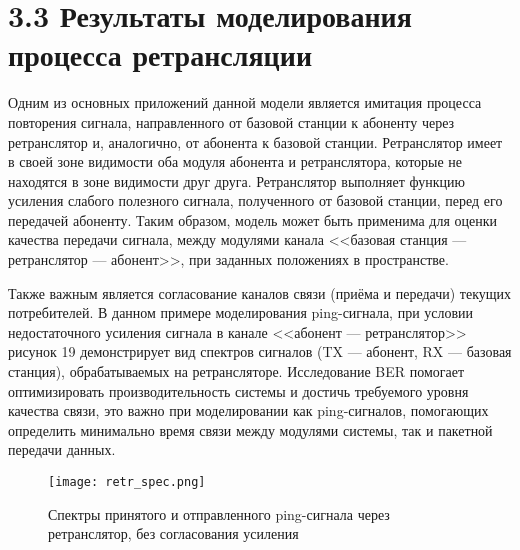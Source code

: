 \section*{\large{3.3 Результаты моделирования процесса ретрансляции}}
\begin{onehalfspace}

Одним из основных приложений данной модели является имитация процесса повторения сигнала, направленного от базовой станции к абоненту через ретранслятор и, аналогично, от абонента к базовой станции. Ретранслятор имеет в своей зоне видимости оба модуля абонента и ретранслятора, которые не находятся в зоне видимости друг друга. Ретранслятор выполняет функцию усиления слабого полезного сигнала, полученного от базовой станции, перед его передачей абоненту. Таким образом, модель может быть применима для оценки качества передачи сигнала, между модулями канала <<базовая станция — ретранслятор — абонент>>, при заданных положениях в пространстве. 


Также важным является согласование каналов связи (приёма и передачи) текущих потребителей. В данном примере моделирования ping-сигнала, при условии недостаточного усиления сигнала в канале <<абонент — ретранслятор>> рисунок 19 демонстрирует вид спектров сигналов (TX — абонент, RX — базовая станция), обрабатываемых на ретрансляторе. Исследование BER помогает оптимизировать производительность системы и достичь требуемого уровня качества связи, это важно при моделировании как ping-сигналов, помогающих определить минимально время связи между модулями системы, так и пакетной передачи данных. 

\end{onehalfspace}

 \begin{figure}[h!]
\centering
\texttt{[image: retr\_spec.png]}
\caption{Спектры принятого и отправленного ping-сигнала через ретранслятор, без согласования усиления}
\label{fig:model22}
\end{figure}

